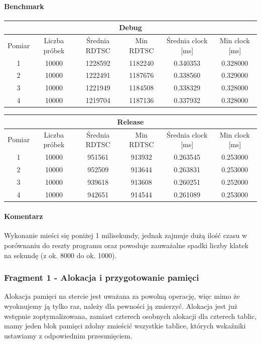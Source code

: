 \documentclass{article}
\begin{document}
	\paragraph{Benchmark}
	\begin{center}
		\begin{tabular}{|c|c|c|c|c|c|} \hline
			\multicolumn{6}{|c|}{Debug} \\\hline
			Pomiar  & Liczba próbek & Średnia RDTSC & Min RDTSC & Średnia clock [ms] & Min clock [ms] \\\hline
			\hline
			1 & 10000 & 1228592 & 1182240 & 0.340353 & 0.328000 \\\hline
			2 & 10000 & 1222491 & 1187676 & 0.338560 & 0.329000 \\\hline
			3 & 10000 & 1221949 & 1184508 & 0.338329 & 0.328000 \\\hline
			4 & 10000 & 1219704 & 1187136 & 0.337932 & 0.328000 \\\hline
			
		\end{tabular}
	\end{center}
	\begin{center}
		\begin{tabular}{|c|c|c|c|c|c|} \hline
			\multicolumn{6}{|c|}{Release} \\\hline
			Pomiar  & Liczba próbek & Średnia RDTSC & Min RDTSC & Średnia clock [ms] & Min clock [ms] \\\hline
			\hline
			1 & 10000 & 951561 & 913932 & 0.263545 & 0.253000 \\\hline
			2 & 10000 & 952509 & 913644 & 0.263831 & 0.253000 \\\hline
			3 & 10000 & 939618 & 913608 & 0.260251 & 0.252000 \\\hline
			4 & 10000 & 942651 & 914544 & 0.261089 & 0.253000 \\\hline
			
		\end{tabular}
	\end{center}
	
	\paragraph{Komentarz}
	Wykonanie mieści się poniżej 1 milisekundy, jednak zajmuje dużą ilość czasu w porównaniu do reszty programu oraz powoduje zauważalne spadki liczby klatek na sekundę (z ok. 8000 do ok. 1000).
	
	
	\pagebreak
	\subsubsection{Fragment 1 - Alokacja i przygotowanie pamięci}
	Alokacja pamięci na stercie jest uważana za powolną operację, więc mimo że wyoknujemy ją tylko raz, należy dla pewności ją zmierzyć. Alokacja jest już wstępnie zoptymalizowana, zamiast czterech osobnych alokacji dla czterech tablic, mamy jeden blok pamięci zdolny zmieścić wszystkie tablice, których wskaźniki ustawiamy z odpowiednim przesunięciem.
\end{document}
